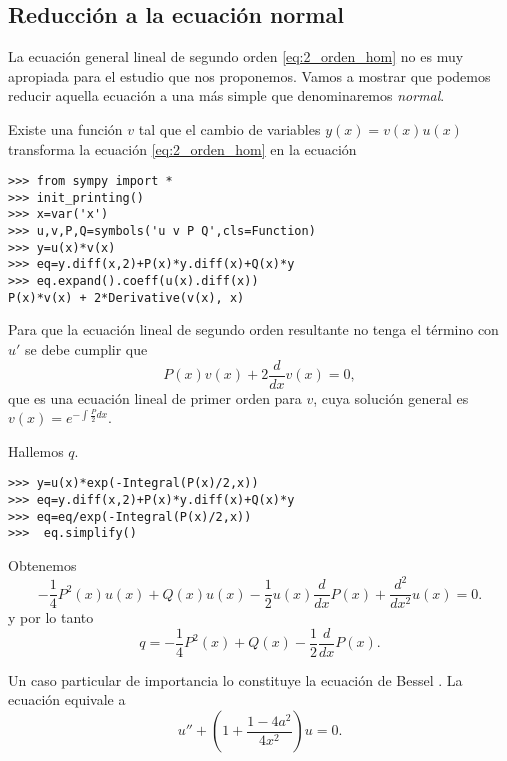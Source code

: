 \subsection{Reducción a la ecuación normal}

La ecuación general lineal  de segundo orden  \eqref{eq:2_orden_hom} no es muy apropiada para el estudio que nos proponemos. Vamos a mostrar que podemos reducir aquella ecuación a una más simple que denominaremos \emph{normal}.

\begin{teorema} Existe una función $v$ tal que el cambio de variables $y(x)=v(x)u(x)$ transforma la ecuación \eqref{eq:2_orden_hom} en la ecuación
\end{teorema}
\begin{demo} 
\begin{lstlisting}
>>> from sympy import *
>>> init_printing()
>>> x=var('x')
>>> u,v,P,Q=symbols('u v P Q',cls=Function)
>>> y=u(x)*v(x)
>>> eq=y.diff(x,2)+P(x)*y.diff(x)+Q(x)*y
>>> eq.expand().coeff(u(x).diff(x))
P(x)*v(x) + 2*Derivative(v(x), x)
\end{lstlisting}

Para que la ecuación lineal de segundo orden resultante no tenga el término con $u'$ se debe cumplir que
\[ P{\left (x \right )} v{\left (x \right )} + 2 \frac{d}{d x} v{\left (x \right )}=0,\]
que es una ecuación lineal de primer orden para $v$, cuya  solución general es $v(x)=e^{-\int\frac{P}{2}dx}$.
\end{demo}

Hallemos $q$.
\begin{lstlisting}
>>> y=u(x)*exp(-Integral(P(x)/2,x))
>>> eq=y.diff(x,2)+P(x)*y.diff(x)+Q(x)*y
>>> eq=eq/exp(-Integral(P(x)/2,x))
>>>  eq.simplify()
\end{lstlisting}


Obtenemos
\[\boxed{- \frac{1}{4} P^{2}{\left (x \right )} u{\left (x \right )} + Q{\left (x \right 
)} u{\left (x \right )} - \frac{1}{2} u{\left (x \right )} \frac{d}{d x} P{\left
 (x \right )} + \frac{d^{2}}{d x^{2}}  u{\left (x \right )}=0}.\]
y por lo tanto
\[\boxed{q=- \frac{1}{4} P^{2}{\left (x \right )} + Q{\left (x \right )} - \frac{1}{2} \frac{d}{d x} P{\left (x \right )}}.\]
 
\begin{ejemplo} Un caso particular de importancia lo constituye la ecuación de Bessel
 .
La ecuación equivale a
\begin{equation}\label{bessel_normal}\boxed{u''+\left(1+\frac{1-4a^2}{4x^2}\right)u=0}.
\end{equation}
\end{ejemplo}

